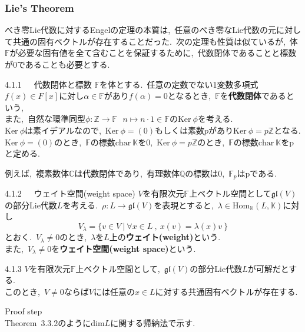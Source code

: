 \documentclass[uplatex,dvipdfmx]{jsarticle}
\begin{document}
\subsubsection{Lie's Theorem}
べき零Lie代数に対するEngelの定理の本質は,~任意のべき零なLie代数の元に対して共通の固有ベクトルが存在することだった.~次の定理も性質は似ているが,~体$\mathbb{F}$が必要な固有値を全て含むことを保証するために,~代数閉体であることと標数が0であることも必要とする.
\begin{mydef}{4.1.1~~~代数閉体と標数}
    $\mathbb{F}$を体とする.~任意の定数でない1変数多項式$f(x)\in F[x]$に対し$\alpha\in \mathbb{F}$があり$f(\alpha)=0$となるとき,~$\mathbb{F}$を\textbf{代数閉体}であるという,\\
    また,~自然な環準同型$\phi:\mathbb{Z}\to \mathbb{F}~~~n\mapsto n\cdot 1 \in \mathbb{F}$の$\text{Ker}~\phi$を考える.\\
    $\text{Ker}~\phi$は素イデアルなので,~$\text{Ker}~\phi = (0)$もしくは素数$p$があり$\text{Ker}~\phi=p\mathbb{Z}$となる.\\
    $\text{Ker}~\phi = (0)$のとき,~$\mathbb{F}$の標数$\text{char}~\mathbb{K}$を0,~$\text{Ker}~\phi=p\mathbb{Z}$のとき,~$\mathbb{F}$の標数${\text{char}}~\mathbb{K}$をpと定める.
\end{mydef}
例えば,~複素数体$\mathbb{C}$は代数閉体であり,~有理数体$\mathbb{Q}$の標数は0,~$\mathbb{F}_p$はpである.
\begin{mydef}{4.1.2~~~ウェイト空間(weight space)}
    $V$を有限次元$\mathbb{F}$上ベクトル空間として$\mathfrak{gl}(V)$の部分Lie代数$L$を考える.~$\rho:L\to \mathfrak{gl}(V)$を表現とすると,~$\lambda\in \text{Hom}_{\mathbb{K}}(L,\mathbb{K})$に対し
    \begin{equation*}
        V_\lambda =\{v\in V~|~\forall x\in L ~,~x(v)=\lambda(x)v~\}
    \end{equation*}
    とおく.~$V_\lambda\neq0$のとき,~$\lambda$を$L$上の\textbf{ウェイト(weight)}という.\\
    また,~$V_\lambda\neq0$を\textbf{ウェイト空間(weight space)}という.
\end{mydef}
\begin{mythm}{4.1.3}
    $V$を有限次元$\mathbb{F}$上ベクトル空間として,~$\mathfrak{gl}(V)$の部分Lie代数$L$が可解だとする.\\
    このとき,~$V\neq 0$ならば$V$には任意の$x\in L$に対する共通固有ベクトルが存在する.
\end{mythm}
Proof step\\
Theorem~3.3.2のようにdim$L$に関する帰納法で示す.\\
\end{document}
